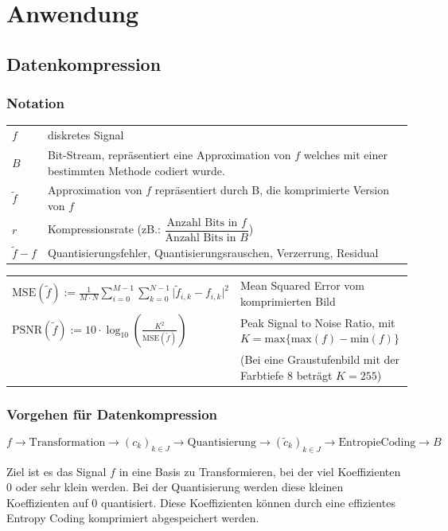 \section{Anwendung}

\subsection{Datenkompression}

\subsubsection{Notation}
\begin{tabular}{ll}
$f$ & diskretes Signal\\
$B$ & Bit-Stream, repräsentiert eine Approximation von $f$ welches mit einer bestimmten Methode codiert wurde. \\
$\tilde{f}$ & Approximation von $f$ repräsentiert durch B, die komprimierte Version von $f$\\
$r$ & Kompressionsrate (zB.: $\dfrac{\text{Anzahl Bits in }f}{\text{Anzahl Bits in }B}$)\\
$\tilde{f}-f$ & Quantisierungsfehler, Quantisierungsrauschen, Verzerrung, Residual\\
\end{tabular}
\begin{tabular}{ll}
$\mathrm{MSE}(\tilde{f}) := \frac{1}{M \cdot N}\sum_{i=0}^{M-1}\sum_{k=0}^{N-1}\lvert \tilde{f}_{i,k}-f_{i,k} \rvert^2$ & Mean Squared Error vom komprimierten Bild\\
$\mathrm{PSNR}(\tilde{f}) := 10 \cdot \log_{10}(\frac{K^2}{\mathrm{MSE}(\tilde{f})})$ & Peak Signal to Noise Ratio, mit $K=\mathrm{max}\{\mathrm{max}(f)-\mathrm{min}(f)\}$ \\
 &  (Bei eine Graustufenbild mit der Farbtiefe 8 beträgt $K=255$)
\end{tabular}

\subsubsection{Vorgehen für Datenkompression}
\[ 
	f \longrightarrow \boxed{\mathrm{Transformation}} \longrightarrow (c_k)_{k\in J} \longrightarrow \boxed{\mathrm{Quantisierung}} \longrightarrow (\tilde{c}_k)_{k \in J} \longrightarrow \boxed{\mathrm{Entropie Coding}}\longrightarrow B 
\]

Ziel ist es das Signal $f$ in eine Basis zu Transformieren, bei der viel Koeffizienten 0 oder sehr klein werden. Bei der Quantisierung werden diese kleinen Koeffizienten auf 0 quantisiert. Diese Koeffizienten können durch eine effizientes Entropy Coding komprimiert abgespeichert werden.\\

